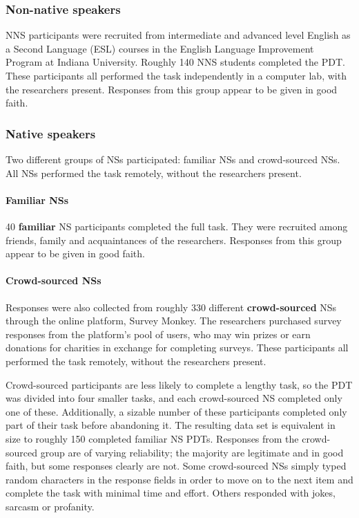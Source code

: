 \documentclass[12pt]{article}
\begin{document}
\subsubsection{Non-native speakers}
NNS participants were recruited from intermediate and advanced level English as a Second Language (ESL) courses in the English Language Improvement Program at Indiana University. Roughly 140 NNS students completed the PDT. These participants all performed the task independently in a computer lab, with the researchers present. Responses from this group appear to be given in good faith.

\subsubsection{Native speakers}
Two different groups of NSs participated: familiar NSs and crowd-sourced NSs. All NSs performed the task remotely, without the researchers present.

\paragraph{Familiar NSs}
40 \textbf{familiar} NS participants completed the full task. They were recruited among friends, family and acquaintances of the researchers. Responses from this group appear to be given in good faith.

\paragraph{Crowd-sourced NSs}
Responses were also collected from roughly 330 different \textbf{crowd-sourced} NSs through the online platform, Survey Monkey. The researchers purchased survey responses from the platform's pool of users, who may win prizes or earn donations for charities in exchange for completing surveys. These participants all performed the task remotely, without the researchers present.

Crowd-sourced participants are less likely to complete a lengthy task, so the PDT was divided into four smaller tasks, and each crowd-sourced NS completed only one of these. Additionally, a sizable number of these participants completed only part of their task before abandoning it. The resulting data set is equivalent in size to roughly 150 completed familiar NS PDTs. Responses from the crowd-sourced group are of varying reliability; the majority are legitimate and in good faith, but some responses clearly are not. Some crowd-sourced NSs simply typed random characters in the response fields in order to move on to the next item and complete the task with minimal time and effort. Others responded with jokes, sarcasm or profanity.
\end{document}
